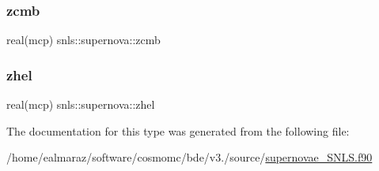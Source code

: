 \mbox{\label{structsnls_1_1supernova_ae718c87952c492cb3bd8f80a79cc1f26}} 
\subsubsection{\texorpdfstring{zcmb}{zcmb}}
{\footnotesize\ttfamily real(mcp) snls\+::supernova\+::zcmb\hspace{0.3cm}{\ttfamily [private]}}

\mbox{\label{structsnls_1_1supernova_a3006274804a1b8a3227b6038800c97b9}} 
\subsubsection{\texorpdfstring{zhel}{zhel}}
{\footnotesize\ttfamily real(mcp) snls\+::supernova\+::zhel\hspace{0.3cm}{\ttfamily [private]}}



The documentation for this type was generated from the following file\+:\begin{DoxyCompactItemize}
\item 
/home/ealmaraz/software/cosmomc/bde/v3./source/\mbox{\hyperlink{supernovae__SNLS_8f90}{supernovae\+\_\+\+S\+N\+L\+S.\+f90}}\end{DoxyCompactItemize}
